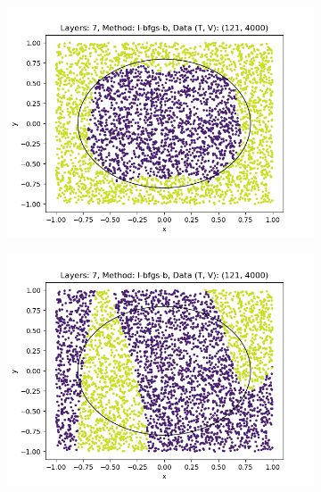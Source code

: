 \begin{figure}[h]
\begin{subfigure}[b]{0.45\textwidth}
        \includegraphics[width=\textwidth]{sections/chapters/Quantum-Machine-Learning/Images/Data-Re-Uploading/Layer7-A.png}
    \end{subfigure}
    \begin{subfigure}[b]{0.45\textwidth}
        \centering
        \includegraphics[width=\textwidth]{sections/chapters/Quantum-Machine-Learning/Images/Data-Re-Uploading/Layer7-B.png}
    \end{subfigure}
    \begin{subfigure}[b]{0.45\textwidth}
        \centering

\end{subfigure}
\end{figure}
